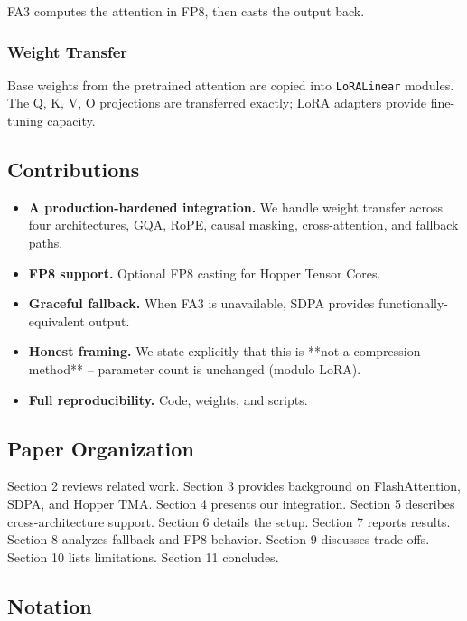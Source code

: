FA3 computes the attention in FP8, then casts the output back.

\subsubsection{Weight Transfer}

Base weights from the pretrained attention are copied into \texttt{LoRALinear} 
modules. The Q, K, V, O projections are transferred exactly; LoRA adapters 
provide fine-tuning capacity.

\subsection{Contributions}

\begin{itemize}
\item \textbf{A production-hardened integration.} We handle weight transfer across
  four architectures, GQA, RoPE, causal masking, cross-attention, and
  fallback paths.
\item \textbf{FP8 support.} Optional FP8 casting for Hopper Tensor Cores.
\item \textbf{Graceful fallback.} When FA3 is unavailable, SDPA provides
  functionally-equivalent output.
\item \textbf{Honest framing.} We state explicitly that this is **not a compression
  method** -- parameter count is unchanged (modulo LoRA).
\item \textbf{Full reproducibility.} Code, weights, and scripts.

\end{itemize}
\subsection{Paper Organization}

Section 2 reviews related work. Section 3 provides background on 
FlashAttention, SDPA, and Hopper TMA. Section 4 presents our integration. 
Section 5 describes cross-architecture support. Section 6 details the setup. 
Section 7 reports results. Section 8 analyzes fallback and FP8 behavior. 
Section 9 discusses trade-offs. Section 10 lists limitations. Section 11 
concludes.



\subsection{Notation}

